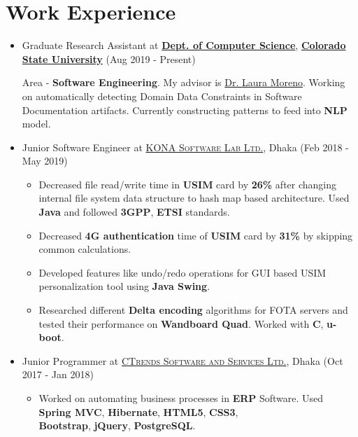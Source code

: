 \documentclass[letterpaper,10pt]{article}
\begin{document}
\section{Work Experience}
\begin{itemize}
    \item Graduate Research Assistant at \href{http://compsci.colostate.edu}{\textbf{Dept. of Computer Science}}, \href{https://www.coloslostate.edu}{\textbf{\textbf{Colorado State University}}} \hfill (Aug 2019 - Present)
    
    Area - \textbf{Software Engineering}. My advisor is \href{https://www.cs.colostate.edu/~lmorenoc}{Dr. Laura Moreno}. Working on automatically detecting Domain Data Constraints in Software Documentation artifacts. Currently constructing patterns to feed into \textbf{NLP} model. 
    
    \item Junior Software Engineer at \href{http://www.konai.com}{\textsc{KONA Software Lab Ltd.}}, Dhaka \hfill (Feb 2018 - May 2019)
    \begin{itemize}%
         \item Decreased file read/write time in \textbf{USIM} card by \textbf{26\%} after changing internal file system data structure to hash map based architecture. Used \textbf{Java} and followed \textbf{3GPP}, \textbf{ETSI} standards.
         \item Decreased \textbf{4G authentication} time of \textbf{USIM} card by \textbf{31\%} by skipping common calculations.
         \item Developed features like undo/redo operations for GUI based USIM personalization tool using \textbf{Java Swing}.
         \item Researched different \textbf{Delta encoding} algorithms for FOTA servers and tested their performance on \textbf{Wandboard Quad}. Worked with \textbf{C}, \textbf{u-boot}.
    \end{itemize}
    
    \item Junior Programmer at \href{http://www.ctrends-software.com}{\textsc{CTrends Software and Services Ltd.}}, Dhaka \hfill (Oct 2017 - Jan 2018)
    \begin{itemize}
         \item Worked on automating business processes in \textbf{ERP} Software. Used \textbf{Spring MVC}, \textbf{Hibernate}, \textbf{HTML5}, \textbf{CSS3},\\ \textbf{Bootstrap}, \textbf{jQuery}, \textbf{PostgreSQL}.
     \end{itemize}
     
\end{itemize}
\end{document}
